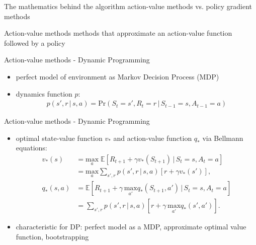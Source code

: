 \documentclass{beamer}
\begin{document}
\begin{frame}{The mathematics behind the algorithm}
\centering
\Large action-value methods vs. policy gradient methods
\end{frame}
\begin{frame}{Action-value methods}
methods that approximate an action-value function followed by a policy
\end{frame}
\begin{frame}{Action-value methods - Dynamic Programming}
	\begin{itemize}
\item perfect model of environment as Markov Decision Process (MDP)
\pause
\item {dynamics function $p$:
\begin{align*}
p(s',r\,|\,s,a) = \mathrm{Pr}(S_{t} = s', R_t = r\,|\, S_{t-1} = s, A_{t-1} = a)
\end{align*}}
	\end{itemize}
\end{frame}
\begin{frame}{Action-value methods - Dynamic Programming}
\begin{itemize}


\item {optimal state-value function $v_*$ and action-value function $q_*$ via Bellmann equations:
\begin{align*}
v_*(s) &= \underset{a}{\mathrm{max}} \; \mathbb{E} \left[ R_{t+1} + \gamma v_* (S_{t+1}) \, | \, S_t = s, A_t = a\right] \\
&= \underset{a}{\mathrm{max}} \sum_{s',r} p(s',r \, | \, s,a) \left[r + \gamma v_*(s')\right],
\\
q_*(s,a) &= \mathbb{E} \left[R_{t+1} + \gamma \, \underset{a'}{\mathrm{max}} q_*(S_{t+1},a') \, |\, S_t = s, A_t = a\right]\\
&= \sum_{s',r} p(s',r \, | \, s,a) \left[r + \gamma \, \underset{a'}{\mathrm{max}} q_* (s',a')\right].
\end{align*}
}
\item characteristic for DP: perfect model as a MDP, approximate optimal value function, bootstrapping
\end{itemize}
\end{frame}
\end{document}
